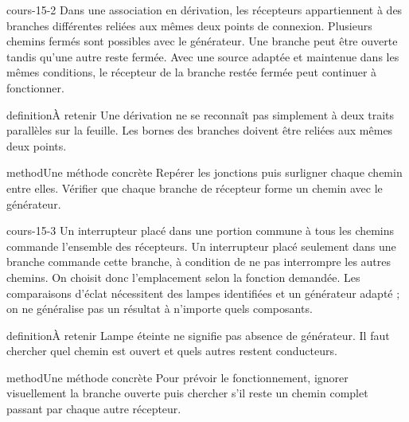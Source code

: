 \documentclass[12pt,twoside,openany]{book}
\begin{document}
\begin{pcFiche}{cours-15-2}
Dans une association en dérivation, les récepteurs appartiennent à des branches différentes reliées aux mêmes deux points de connexion. Plusieurs chemins fermés sont possibles avec le générateur. Une branche peut être ouverte tandis qu’une autre reste fermée. Avec une source adaptée et maintenue dans les mêmes conditions, le récepteur de la branche restée fermée peut continuer à fonctionner.\par
{}
\begin{pcEncadre}{definition}{À retenir}
Une dérivation ne se reconnaît pas simplement à deux traits parallèles sur la feuille. Les bornes des branches doivent être reliées aux mêmes deux points.\par
\end{pcEncadre}
\begin{pcEncadre}{method}{Une méthode concrète}
Repérer les jonctions puis surligner chaque chemin entre elles. Vérifier que chaque branche de récepteur forme un chemin avec le générateur.\par
\end{pcEncadre}
\end{pcFiche}
\label{ch-15-cours-3}
\begin{pcFiche}{cours-15-3}
Un interrupteur placé dans une portion commune à tous les chemins commande l’ensemble des récepteurs. Un interrupteur placé seulement dans une branche commande cette branche, à condition de ne pas interrompre les autres chemins. On choisit donc l’emplacement selon la fonction demandée. Les comparaisons d’éclat nécessitent des lampes identifiées et un générateur adapté ; on ne généralise pas un résultat à n’importe quels composants.\par
{}
\begin{pcEncadre}{definition}{À retenir}
Lampe éteinte ne signifie pas absence de générateur. Il faut chercher quel chemin est ouvert et quels autres restent conducteurs.\par
\end{pcEncadre}
\begin{pcEncadre}{method}{Une méthode concrète}
Pour prévoir le fonctionnement, ignorer visuellement la branche ouverte puis chercher s’il reste un chemin complet passant par chaque autre récepteur.\par
\end{pcEncadre}
\end{pcFiche}
\end{document}
